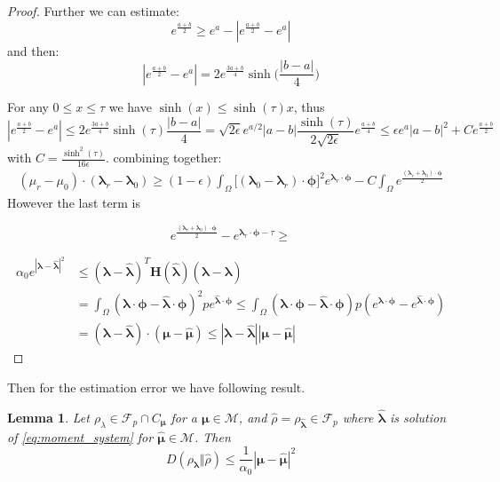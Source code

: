 \documentclass{article}
\newtheorem{lemma}[theorem]{Lemma}
\def\vc#1{\mathbf{\boldsymbol{#1}}}     %
\def\tn#1{\boldsymbol{#1}}
\def\abs#1{|#1|}
\def\vl{{\vc\lambda}}
\def\estvl{{\vc{\hat\lambda}}}
\def\estrho{\hat\rho}
\def\vmu{\vc\mu}
\def\estvmu{{\vc{\hat\mu}}}
\def\vphi{\vc\phi}
\begin{document}
\begin{proof}
Further we can estimate:
\[
    e^\frac{a + b}{2} \ge e^{a} - \abs{e^\frac{a + b}{2} - e^{a}}
\]
and then:
\[
 \abs{e^\frac{a + b}{2} - e^{a}} = 2e^\frac{3a+b}{4} \sinh\Big(\frac{|b-a|}{4}\Big)
\]

For any $0 \le x \le \tau$ we have $\sinh(x) \le \sinh(\tau) x$, thus
\[
 \abs{e^\frac{a + b}{2} - e^{a}} \le 2e^\frac{3a+b}{4} \sinh(\tau) \frac{|b-a|}{4}
 =  \sqrt{2\epsilon} e^{a/2}|a-b| \frac{\sinh(\tau)}{2\sqrt{2\epsilon}} e^{\frac{a+b}{4}}  \le 
    \epsilon e^{a}|a-b|^2 +  C e^{\frac{a+b}{2}}
\]
with $C = \frac{\sinh^2(\tau)}{16\epsilon}$.
combining together:
\begin{align*}
 (\mu_r - \mu_0) \cdot (\vl_r - \vl_0) 
 \ge (1-\epsilon)\int_\Omega  \big[ (\vl_0 - \vl_r) \cdot \vphi \big]^2 e^{\vl_r \cdot \vphi}
 -C \int_\Omega e^\frac{(\vl_r + \vl_0) \cdot \vphi}{2}
\end{align*}
However the last term is 











\[
 e^\frac{(\vl_r + \vl_0) \cdot \vphi}{2} - e^{\vl_r\cdot\vphi-\tau} \ge 
\]





\begin{align*}
  \alpha_0 e^\abs{\vl - \estvl}^2 &\le  (\vl-\estvl)^T\tn H(\estvl)(\vl -\estvl)\\
  &= \int_\Omega (\vl\cdot\vphi  - \estvl\cdot\vphi)^2 pe^{\estvl\cdot\vphi}
  \le \int_{\Omega} (\vl\cdot\vphi - \estvl\cdot\vphi) 
  p(e^{\vl\cdot\vphi} - e^{\estvl\cdot\vphi})\\
  &=  (\vl - \estvl)\cdot(\vmu - \estvmu) \le \abs{\vl - \estvl}\abs{\vmu - \estvmu}
\end{align*}
\end{proof}




Then for the estimation error we have following result.
\begin{lemma}
  \label{thm:est_error}
  Let $\rho_\lambda \in \mathcal F_p \cap C_{\vmu}$ for a $\vmu \in \mathcal M$, 
  and $\estrho = \rho_{\estvl}\in \mathcal F_p$ 
  where $\estvl$ is solution of \eqref{eq:moment_system} for $\estvmu \in \mathcal M$. Then 
  \[
    D(\rho_{\vl}\Vert \estrho) \le \frac{1}{\alpha_0} \abs{\vmu - \estvmu}^2
  \]
\end{lemma}
\end{document}
